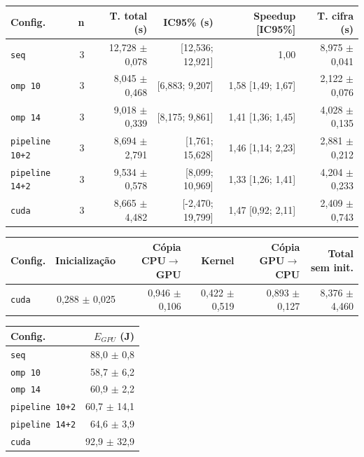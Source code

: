 
\begin{tabular}{lrrrrr}
\hline
\textbf{Config.} & \textbf{n} & \textbf{T. total (s)} & \textbf{IC95\% (s)} & \textbf{Speedup [IC95\%]} & \textbf{T. cifra (s)} \\
\hline
\texttt{seq} & 3 & 12,728 $\pm$ 0,078 & [12,536; 12,921] & 1,00 & 8,975 $\pm$ 0,041 \\
\texttt{omp 10} & 3 & 8,045 $\pm$ 0,468 & [6,883; 9,207] & 1,58 [1,49; 1,67] & 2,122 $\pm$ 0,076 \\
\texttt{omp 14} & 3 & 9,018 $\pm$ 0,339 & [8,175; 9,861] & 1,41 [1,36; 1,45] & 4,028 $\pm$ 0,135 \\
\texttt{pipeline 10+2} & 3 & 8,694 $\pm$ 2,791 & [1,761; 15,628] & 1,46 [1,14; 2,23] & 2,881 $\pm$ 0,212 \\
\texttt{pipeline 14+2} & 3 & 9,534 $\pm$ 0,578 & [8,099; 10,969] & 1,33 [1,26; 1,41] & 4,204 $\pm$ 0,233 \\
\texttt{cuda} & 3 & 8,665 $\pm$ 4,482 & [-2,470; 19,799] & 1,47 [0,92; 2,11] & 2,409 $\pm$ 0,743 \\
\hline
\end{tabular}

\begin{tabular}{lrrrrr}
\hline
\textbf{Config.} & \textbf{Inicializa\c{c}\~ao} & \textbf{C\'opia CPU$\to$GPU} & \textbf{Kernel} & \textbf{C\'opia GPU$\to$CPU} & \textbf{Total sem init.} \\
\hline
\texttt{cuda} & 0,288 $\pm$ 0,025 & 0,946 $\pm$ 0,106 & 0,422 $\pm$ 0,519 & 0,893 $\pm$ 0,127 & 8,376 $\pm$ 4,460 \\
\hline
\end{tabular}

\begin{tabular}{lr}
\hline
\textbf{Config.} & \textbf{$E_{GPU}$ (J)} \\
\hline
\texttt{seq} & 88,0 $\pm$ 0,8 \\
\texttt{omp 10} & 58,7 $\pm$ 6,2 \\
\texttt{omp 14} & 60,9 $\pm$ 2,2 \\
\texttt{pipeline 10+2} & 60,7 $\pm$ 14,1 \\
\texttt{pipeline 14+2} & 64,6 $\pm$ 3,9 \\
\texttt{cuda} & 92,9 $\pm$ 32,9 \\
\hline
\end{tabular}

